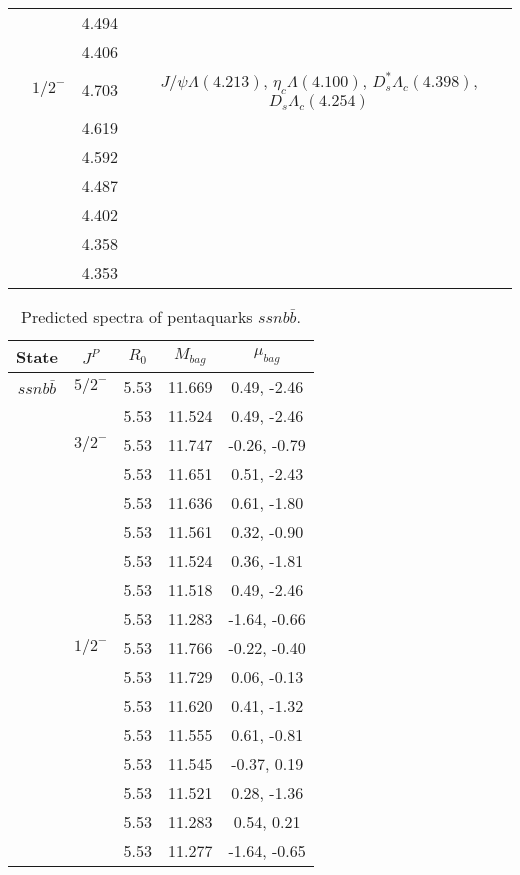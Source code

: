 \documentclass[prd,twocolumn,floatfix,nofootinbib]{revtex4}
\begin{document}
\begin{table*}[!htbp]
\begin{tabular}{cccc}
            &               &4.494 & \\
            &               &4.406 & \\
            &${1/2}^{-}$    &4.703 &$J/\psi\Lambda(4.213)$, $\eta_{c}\Lambda(4.100)$, $D_{s}^{\ast}\Lambda_{c}(4.398)$, $D_{s}\Lambda_{c}(4.254)$ \\
            &               &4.619 & \\
            &               &4.592 & \\
            &               &4.487 & \\
            &               &4.402 & \\
            &               &4.358 & \\
            &               &4.353 & \\
        \hline\hline
    \end{tabular}
\end{table*}

\renewcommand{\tabcolsep}{0.5cm}
\renewcommand{\arraystretch}{1.2}
\begin{table*}[!htbp]
    \caption{Predicted spectra of pentaquarks $ssnb\bar{b}$.}
    \begin{tabular}{ccccc}
        \hline\hline
        {\rm State} &$J^{P}$ &$R_{0}$ &$M_{bag}$ &$\mu_{bag}$ \\ \hline
        $ssnb\bar{b}$
            &${5/2}^{-}$    &5.53  &11.669 &0.49, -2.46 \\
            &               &5.53   &11.524 &0.49, -2.46   \\
            &${3/2}^{-}$    &5.53   &11.747 &-0.26, -0.79  \\
            &               &5.53   &11.651 &0.51, -2.43  \\
            &               &5.53   &11.636 &0.61, -1.80  \\
            &               &5.53   &11.561 &0.32, -0.90  \\
            &               &5.53   &11.524 &0.36, -1.81  \\
            &               &5.53   &11.518 &0.49, -2.46  \\
            &               &5.53   &11.283 &-1.64, -0.66  \\
            &${1/2}^{-}$    &5.53   &11.766 &-0.22, -0.40  \\
            &               &5.53   &11.729 &0.06, -0.13  \\
            &               &5.53   &11.620 &0.41, -1.32  \\
            &               &5.53   &11.555 &0.61, -0.81  \\
            &               &5.53   &11.545 &-0.37, 0.19  \\
            &               &5.53   &11.521 &0.28, -1.36  \\
            &               &5.53   &11.283 &0.54, 0.21  \\
            &               &5.53   &11.277 &-1.64, -0.65  \\
        \hline\hline
    \end{tabular}
\end{table*}
\end{document}
